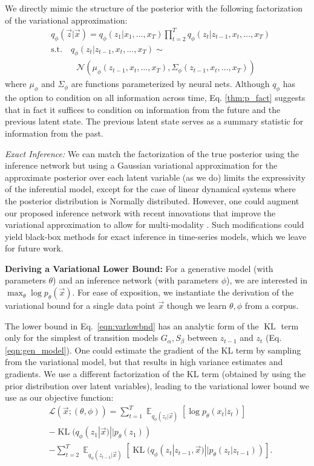 \documentclass[letterpaper]{article}
\newcommand{\Exp}[2]{\mathop{\mathbb{E}}_{#2}\left[#1\right]}
\DeclareMathOperator{\KL}{KL}
\newcommand{\pth}{p_\theta}
\newcommand{\qph}{q_\phi}
\newcommand{\vecx}{\vec{x}}
\newcommand{\vecz}{\vec{z}}
\newcommand{\meanfxn}{\textit{G}_{\alpha}}
\newcommand{\covfxn}{\textit{S}_{\beta}}
\newcommand{\lthph}{\mathcal{L}(\vecx;(\theta, \phi))}
\theoremstyle{plain}
\begin{document}
We directly mimic the structure of the posterior with the following factorization of the variational approximation:
\begin{align}
	\label{eqn:q_fact}
&\qph(\vecz|\vecx) = \qph(z_1|x_1,\ldots,x_T) \prod_{t=2}^T \qph(z_t|z_{t-1},x_t, \ldots, x_T)\\ 
&\text{s.t.}\quad \qph(z_t|z_{t-1},x_t, \ldots, x_T) \sim \nonumber\\
& \quad \quad \quad \mathcal{N}\left(\mu_\phi(z_{t-1},x_t, \ldots, x_T), \Sigma_\phi(z_{t-1},x_t, \ldots, x_T)\right) \nonumber
\end{align}
where $\mu_\phi$ and $\Sigma_\phi$ are functions parameterized by neural nets.
Although $\qph$ has the option to condition on all information across time, Eq. \ref{thm:p_fact}
suggests that in fact it suffices to condition on information from the future
and the previous latent state. The previous latent state serves as a summary statistic for information from the past.

\textit{Exact Inference: } We can match the factorization of the true posterior using the inference network
but using a Gaussian variational approximation for the approximate posterior over each latent variable (as we do) limits the expressivity
of the inferential model, except for the case of linear dynamical
systems where the posterior distribution is Normally distributed.
However, one could augment our proposed inference network with recent innovations that improve the variational
approximation to allow for multi-modality \cite{rezende2015variational,tran2016variational}. Such modifications could yield black-box 
methods for exact inference in time-series models, which we leave for future work. 


{\bf Deriving a Variational Lower Bound:} 
For a generative model (with parameters $\theta$) and an inference network (with parameters $\phi$), we are interested in 
$\max_{\theta} \log \pth(\vecx)$. For ease of exposition, we instantiate the derivation of the variational bound for a single data point $\vec{x}$
though we learn $\theta,\phi$ from a corpus. 

The lower bound in Eq.~\ref{eqn:varlowbnd} has an analytic form of the $\KL$ term only for the simplest of transition models $\meanfxn,\covfxn$ between $z_{t-1}$ and $z_t$ (Eq. \ref{eqn:gen_model}). 
One could estimate the gradient of the KL term by sampling from the variational model, 
but that results in high variance estimates and gradients. We use a different factorization of the KL term (obtained by using the prior distribution over latent variables), leading to the variational lower bound we use as our objective function:
\begin{align}
\label{eqn:bound_likelihood}
&\lthph = \sum_{t=1}^T\Exp{\log \pth(x_t|z_t)}{\qph(z_t|\vecx)}\\ 
&-\KL(\qph(z_1|\vecx)||\pth(z_1))\nonumber\\
&-\sum_{t=2}^{T} \Exp{\KL(\qph(z_t|z_{t-1},\vecx)||\pth(z_t|z_{t-1}))}{\qph(z_{t-1}|\vecx)}\nonumber.
\end{align}
\end{document}
